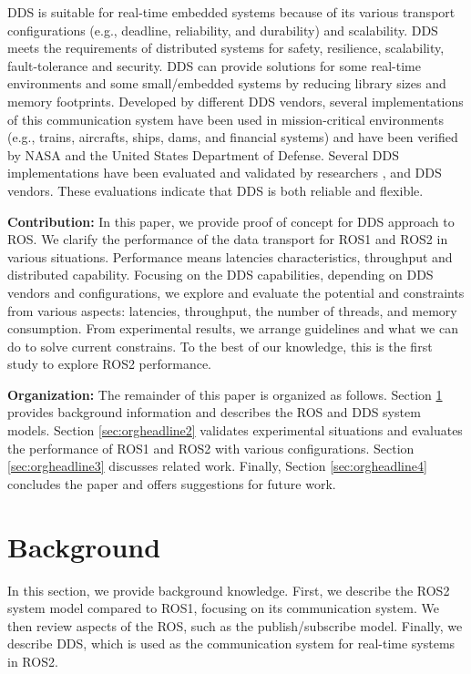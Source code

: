 \documentclass{sig-alternate-05-2015}
\begin{document}
DDS is suitable for real-time embedded systems because of its various transport configurations (e.g., deadline, reliability, and durability) and scalability.
DDS meets the requirements of distributed systems for safety, resilience, scalability, fault-tolerance and security.
DDS can provide solutions for some real-time environments and some small/embedded systems by reducing library sizes and memory footprints.
Developed by different DDS vendors, several implementations of this communication system have been used in mission-critical environments (e.g., trains, aircrafts, ships, dams, and financial systems) and have been verified by NASA and the United States Department of Defense. 
Several DDS implementations have been evaluated and validated by researchers \cite{xiong2010evaluating}, \cite{sierla2003evaluation} and DDS vendors.
These evaluations indicate that DDS is both reliable and flexible.

\textbf{Contribution:}
In this paper, we provide proof of concept for DDS approach to ROS.
We clarify the performance of the data transport for ROS1 and ROS2 in various situations.
Performance means latencies characteristics, throughput and distributed capability.
Focusing on the DDS capabilities, depending on DDS vendors and configurations, we explore and evaluate the potential and constraints from various aspects: latencies, throughput, the number of threads, and memory consumption.
From experimental results, we arrange guidelines and what we can do to solve current constrains.
To the best of our knowledge, this is the first study to explore ROS2 performance.

\textbf{Organization:} 
The remainder of this paper is organized as follows. 
Section \ref{sec:orgheadline1} provides background information and describes the ROS and DDS system models. 
Section \ref{sec:orgheadline2} validates experimental situations and evaluates the performance of ROS1 and ROS2 with various configurations. 
Section \ref{sec:orgheadline3} discusses related work. 
Finally, Section \ref{sec:orgheadline4} concludes the paper and offers suggestions for future work.

\vspace{-3mm}
\section{Background}
\label{sec:orgheadline1}

In this section, we provide background knowledge. 
First, we describe the ROS2 system model compared to ROS1, focusing on its communication system. 
We then review aspects of the ROS, such as the publish/subscribe model. 
Finally, we describe DDS, which is used as the communication system for real-time systems in ROS2. 
\end{document}
